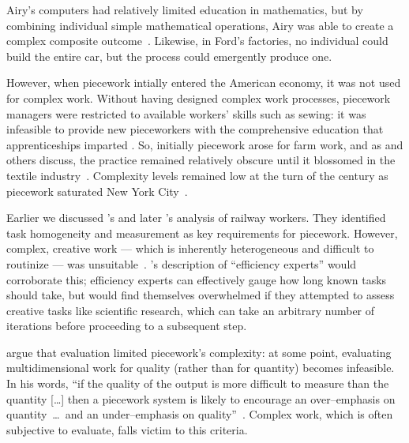 \documentclass[trackingWork]{subfiles}
\begin{document}

Airy's computers had relatively limited education in mathematics, but by combining individual simple mathematical operations, Airy was able to create a complex composite outcome~\cite{grier2013computers}.
Likewise, in Ford's factories, no individual could build the entire car, but the process could emergently produce one.

However, when piecework intially entered the American economy,
it was not used for complex work.
Without having designed complex work processes, piecework managers were restricted to available workers' skills such as sewing: it was infeasible to provide new pieceworkers with the comprehensive education
that apprenticeships imparted \cite{hart2013rise}.
So, initially piecework arose for farm work, and as
\citeauthor{hughRaynbirdTaskWork} and others discuss,
the practice remained relatively obscure until
it blossomed in the textile industry~\cite{hughRaynbirdTaskWork}.
Complexity levels remained low at the turn of
the  century as piecework saturated New York City~\cite{riisOtherSideLives}.

Earlier we discussed \citeauthor{10.2307/23702539}'s and later \citeauthor{Brown01041990}'s analysis of railway workers.
They identified task homogeneity and measurement as key requirements for piecework.
However, complex, creative work
--- which is inherently heterogeneous and difficult to routinize ---
was unsuitable~\cite{10.2307/23702539}.
\citeauthor{Brown01041990}'s description of ``efficiency experts'' would corroborate this;
efficiency experts can effectively gauge how long known tasks should take, but
would find themselves overwhelmed if they attempted to assess creative tasks like scientific research,
which can take an arbitrary number of iterations before proceeding to a subsequent step.


\citeauthor{hart2016rise} argue that evaluation limited piecework's complexity:
at some point, evaluating multidimensional work for quality
(rather than for quantity) becomes infeasible.
In his words,
``if the quality of the output is more difficult to measure than the quantity [\ldots]
then a piecework system is likely to encourage
an over--emphasis on quantity~\dots~and an under--emphasis on quality''~\cite{hart2016rise}.
Complex work, which is often subjective to evaluate, falls victim to this criteria.
\end{document}
